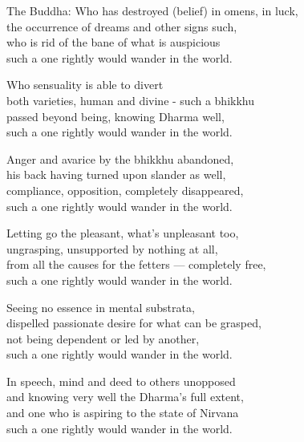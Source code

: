 \begin{MyDescription}{The Buddha:}
Who has destroyed (belief) in omens, in luck,\\
the occurrence of dreams and other signs such,\\
who is rid of the bane of what is auspicious\\
such a one rightly would wander in the world.
\end{MyDescription}

\begin{MyDescription}{}
Who sensuality is able to divert\\
both varieties, human and divine - such a bhikkhu\\
passed beyond being, knowing Dharma well,\\
such a one rightly would wander in the world.
\end{MyDescription}

\begin{MyDescription}{}
Anger and avarice by the bhikkhu abandoned,\\
his back having turned upon slander as well,\\
compliance, opposition, completely disappeared,\\
such a one rightly would wander in the world.
\end{MyDescription}

\begin{MyDescription}{}
Letting go the pleasant, what's unpleasant too,\\
ungrasping, unsupported by nothing at all,\\
from all the causes for the fetters — completely free,\\
such a one rightly would wander in the world.
\end{MyDescription}

\begin{MyDescription}{}
Seeing no essence in mental substrata,\\
dispelled passionate desire for what can be grasped,\\
not being dependent or led by another,\\
such a one rightly would wander in the world.
\end{MyDescription}

\begin{MyDescription}{}
In speech, mind and deed to others unopposed\\
and knowing very well the Dharma's full extent,\\
and one who is aspiring to the state of Nirvana\\
such a one rightly would wander in the world.
\end{MyDescription}

